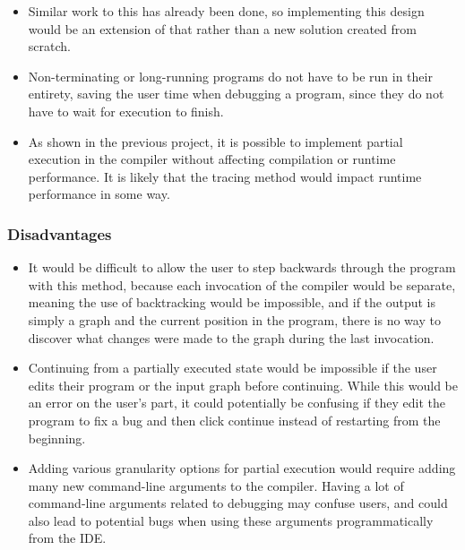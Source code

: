 \documentclass[authoryearcitations]{UoYCSproject}
\begin{document}
\begin{itemize}
    \item Similar work to this has already been done, so implementing this
          design would be an extension of that rather than a new solution
          created from scratch.

    \item Non-terminating or long-running programs do not have to be run in their
          entirety, saving the user time when debugging a program, since they do
          not have to wait for execution to finish.

    \item As shown in the previous project, it is possible to implement partial
          execution in the compiler without affecting compilation or runtime
          performance. It is likely that the tracing method would impact runtime
          performance in some way.
\end{itemize}


\subsubsection{Disadvantages}
\label{sec:ProposedDesign1Disadvantages}

\begin{itemize}
    \item It would be difficult to allow the user to step backwards through the
          program with this method, because each invocation of the compiler
          would be separate, meaning the use of backtracking would be impossible,
          and if the output is simply a graph and the current position in the
          program, there is no way to discover what changes were made to the graph
          during the last invocation.

    \item Continuing from a partially executed state would be impossible if the
          user edits their program or the input graph before continuing. While
          this would be an error on the user's part, it could potentially be
          confusing if they edit the program to fix a bug and then click continue
          instead of restarting from the beginning.

    \item Adding various granularity options for partial execution would require
          adding many new command-line arguments to the compiler. Having a lot
          of command-line arguments related to debugging may confuse users, and
          could also lead to potential bugs when using these arguments
          programmatically from the IDE.
\end{itemize}
\end{document}
